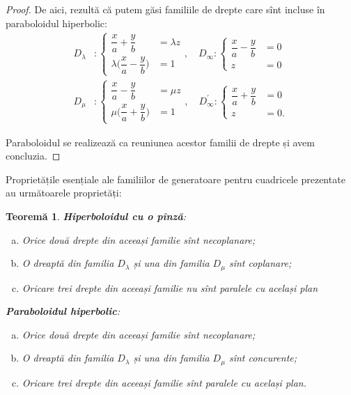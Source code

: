 \documentclass[11pt,a4paper]{article}
\theoremstyle{dotless}
\newtheorem{theorem}{Teorem\u{a}}[section]
\theoremstyle{dotlessdr}
\begin{document}
\begin{proof}
De aici, rezultă că putem găsi familiile de drepte care sînt incluse în
paraboloidul hiperbolic:
\begin{align*}
	D_\lambda &: \begin{cases}	
					\dfrac{x}{a} + \dfrac{y}{b} &= \lambda z \\
					\lambda \Big( \dfrac{x}{a} - \dfrac{y}{b} \Big) &= 1
				\end{cases}, \quad
	D_\infty : \begin{cases}
					\dfrac{x}{a} - \dfrac{y}{b} &= 0 \\
					z &= 0
				\end{cases} \\
	D_\mu &: \begin{cases}	
				\dfrac{x}{a} - \dfrac{y}{b} &= \mu z \\
				\mu \Big( \dfrac{x}{a} + \dfrac{y}{b} \Big) &= 1
			\end{cases}, \quad
	D^{\prime}_\infty : \begin{cases}	
							\dfrac{x}{a} + \dfrac{y}{b} &= 0 \\
							z &= 0.
						\end{cases}
\end{align*}

Paraboloidul se realizează ca reuniunea acestor familii de drepte și avem
concluzia.

\end{proof}

Proprietățile esențiale ale familiilor de generatoare pentru cuadricele 
prezentate au următoarele proprietăți:

\begin{theorem}
	\textbf{Hiperboloidul cu o pînză}:
\begin{enumerate}[(a)]
	\item Orice două drepte din aceeași familie sînt necoplanare;
	\item O dreaptă din familia $D_\lambda$ și una din familia $D_\mu$
sînt coplanare;
	\item Oricare trei drepte din aceeași familie nu sînt paralele
cu același plan
\end{enumerate}

\textbf{Paraboloidul hiperbolic}:
\begin{enumerate}[(a)]
	\item Orice două drepte din aceeași familie sînt necoplanare;
	\item O dreaptă din familia $D_\lambda$ și una din familia $D_\mu$
sînt concurente;
    \item Oricare trei drepte din aceeași familie sînt paralele cu același plan.
\end{enumerate}
\end{theorem}
\end{document}
